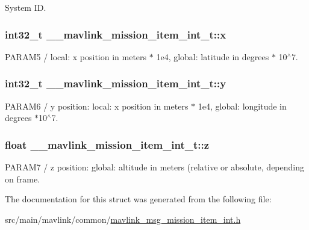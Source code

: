 System I\+D. 

\hypertarget{struct____mavlink__mission__item__int__t_acb2e18b8ef9650b44d3fdd0600e07df2}{
\subsubsection[{x}]{\setlength{\rightskip}{0pt plus 5cm}int32\+\_\+t \+\_\+\+\_\+mavlink\+\_\+mission\+\_\+item\+\_\+int\+\_\+t\+::x}}\label{struct____mavlink__mission__item__int__t_acb2e18b8ef9650b44d3fdd0600e07df2}


P\+A\+R\+A\+M5 / local\+: x position in meters $\ast$ 1e4, global\+: latitude in degrees $\ast$ 10$^\wedge$7. 

\hypertarget{struct____mavlink__mission__item__int__t_a4fcf0d3040a83cbe42d4f9e4d2137a4b}{
\subsubsection[{y}]{\setlength{\rightskip}{0pt plus 5cm}int32\+\_\+t \+\_\+\+\_\+mavlink\+\_\+mission\+\_\+item\+\_\+int\+\_\+t\+::y}}\label{struct____mavlink__mission__item__int__t_a4fcf0d3040a83cbe42d4f9e4d2137a4b}


P\+A\+R\+A\+M6 / y position\+: local\+: x position in meters $\ast$ 1e4, global\+: longitude in degrees $\ast$10$^\wedge$7. 

\hypertarget{struct____mavlink__mission__item__int__t_a11bf93cf254a0f5178c7f9a422657857}{
\subsubsection[{z}]{\setlength{\rightskip}{0pt plus 5cm}float \+\_\+\+\_\+mavlink\+\_\+mission\+\_\+item\+\_\+int\+\_\+t\+::z}}\label{struct____mavlink__mission__item__int__t_a11bf93cf254a0f5178c7f9a422657857}


P\+A\+R\+A\+M7 / z position\+: global\+: altitude in meters (relative or absolute, depending on frame. 



The documentation for this struct was generated from the following file\+:\begin{DoxyCompactItemize}
\item 
src/main/mavlink/common/\hyperlink{mavlink__msg__mission__item__int_8h}{mavlink\+\_\+msg\+\_\+mission\+\_\+item\+\_\+int.\+h}\end{DoxyCompactItemize}
